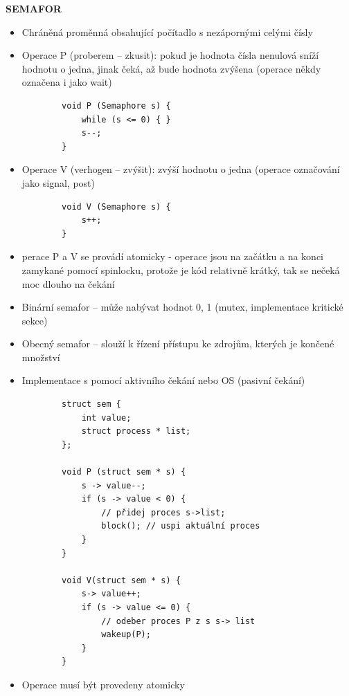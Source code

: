 \documentclass[10pt,a4paper]{article}
\begin{document}
\textbf{SEMAFOR}
\begin{itemize}
	\item Chráněná proměnná obsahující počítadlo s nezápornými celými čísly
	\item Operace P (proberem – zkusit): pokud je hodnota čísla nenulová sníží hodnotu o jedna, jinak čeká, až bude hodnota zvýšena (operace někdy označena i jako wait)
	\begin{verbatim}
		void P (Semaphore s) {
			while (s <= 0) { }
			s--;
		}
	\end{verbatim}
	\item Operace V (verhogen – zvýšit): zvýší hodnotu o jedna (operace označování jako signal, post)
	\begin{verbatim}
		void V (Semaphore s) {
			s++;
		}
	\end{verbatim}
	\item perace P a V se provádí atomicky - operace jsou na začátku a na konci zamykané pomocí spinlocku, protože je kód relativně krátký, tak se nečeká moc dlouho na čekání
	\item Binární semafor – může nabývat hodnot 0, 1 (mutex, implementace kritické sekce)
	\item Obecný semafor – slouží k řízení přístupu ke zdrojům, kterých je končené množství
	\item Implementace s pomocí aktivního čekání nebo OS (pasivní čekání)
	\begin{verbatim}
		struct sem {
			int value;
			struct process * list;
		};

		void P (struct sem * s) {
			s -> value--;
			if (s -> value < 0) {
				// přidej proces s->list;
				block(); // uspi aktuální proces
			}
		}

		void V(struct sem * s) {
			s-> value++;
			if (s -> value <= 0) {
				// odeber proces P z s s-> list
				wakeup(P);
			}
		}
	\end{verbatim}
	\item Operace musí být provedeny atomicky
\end{itemize}
\end{document}
